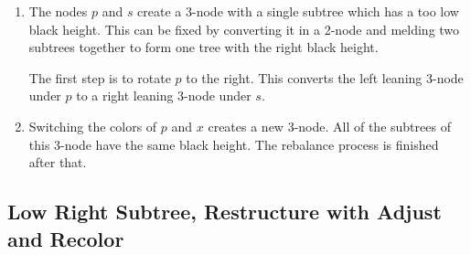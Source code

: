 \documentclass[a4paper,10pt,twoside]{article}
\begin{document}
\begin{enumerate}
\item The nodes $p$ and $s$ create a 3-node with a single subtree which has a
too low black height. This can be fixed by converting it in a 2-node and melding
two subtrees together to form one tree with the right black height.

The first step is to rotate $p$ to the right. This converts the left leaning
3-node under $p$ to a right leaning 3-node under $s$.

\begin{center}
\end{center}


\item Switching the colors of $p$ and $x$ creates a new 3-node. All of the
subtrees of this 3-node have the same black height. The rebalance process is
finished after that.

\begin{center}
\end{center}


\end{enumerate}

\newpage
\subsection{Low Right Subtree, Restructure with Adjust and Recolor}
\end{document}
